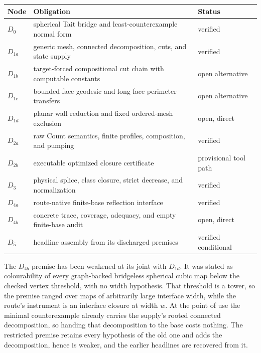 \begin{center}
\small
\begin{tabular}{@{}p{}p{}p{}@{}}
\toprule
Node & Obligation & Status \\
\midrule
$D_0$ & spherical Tait bridge and least-counterexample normal form & verified \\
$D_{1a}$ & generic mesh, connected decomposition, cuts, and state supply & verified \\
$D_{1b}$ & target-forced compositional cut chain with computable constants & open alternative \\
$D_{1c}$ & bounded-face geodesic and long-face perimeter transfers & open alternative \\
$D_{1d}$ & planar wall reduction and fixed ordered-mesh exclusion & open, direct \\
$D_{2a}$ & raw Count semantics, finite profiles, composition, and pumping & verified \\
$D_{2b}$ & executable optimized closure certificate & provisional tool path \\
$D_3$ & physical splice, class closure, strict decrease, and normalization & verified \\
$D_{4a}$ & route-native finite-base reflection interface & verified \\
$D_{4b}$ & concrete trace, coverage, adequacy, and empty finite-base audit & open, direct \\
$D_5$ & headline assembly from its discharged premises & verified conditional \\
\bottomrule
\end{tabular}
\end{center}

The $D_{4b}$ premise has been weakened at its joint with $D_{1d}$.  It was
stated as colourability of every graph-backed bridgeless spherical cubic map
below the checked vertex threshold, with no width hypothesis.  That threshold
is a tower, so the premise ranged over maps of arbitrarily large interface
width, while the route's instrument is an interface closure at width $w$.  At
the point of use the minimal counterexample already carries the supply's
rooted connected decomposition, so handing that decomposition to the base
costs nothing.  The restricted premise retains every hypothesis of the old one
and adds the decomposition, hence is weaker, and the earlier headlines are
recovered from it.

